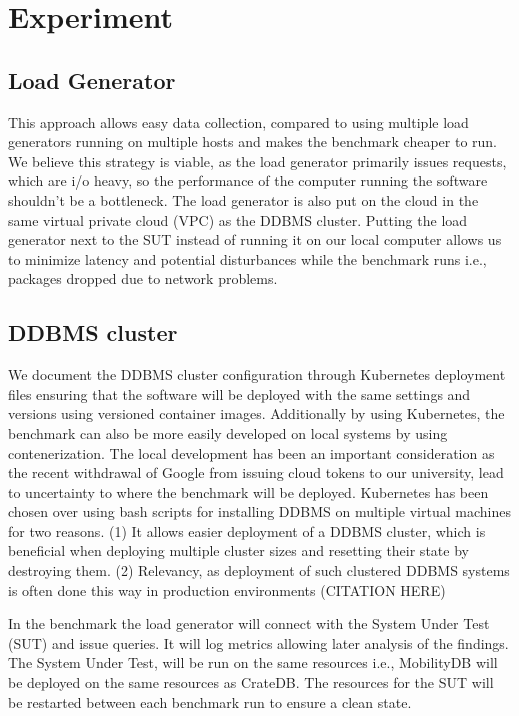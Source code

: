 \section{Experiment}
\label{cha:evaluation}

\subsection{Load Generator}
This approach allows easy data collection, compared to using multiple load generators running on multiple hosts and makes the benchmark cheaper to run.
We believe this strategy is viable, as the load generator primarily issues requests, which are i/o heavy, so the performance of the computer running the software shouldn't be a bottleneck.
The load generator is also put on the cloud in the same virtual private cloud (VPC) as the DDBMS cluster.
Putting the load generator next to the SUT instead of running it on our local computer allows us to minimize latency and potential disturbances while the benchmark runs i.e., packages dropped due to network problems.


\subsection{DDBMS cluster}
We document the DDBMS cluster configuration through Kubernetes deployment files ensuring that the software will be deployed with the same settings and versions using versioned container images.
Additionally by using Kubernetes, the benchmark can also be more easily developed on local systems by using contenerization.
The local development has been an important consideration as the recent withdrawal of Google from issuing cloud tokens to our university, lead to uncertainty to where the benchmark will be deployed.
Kubernetes has been chosen over using bash scripts for installing DDBMS on multiple virtual machines for two reasons.
(1) It allows easier deployment of a DDBMS cluster, which is beneficial when deploying multiple cluster sizes and resetting their state by destroying them.
(2) Relevancy, as deployment of such clustered DDBMS systems is often done this way in production environments (CITATION HERE)

In the benchmark the load generator will connect with the System Under Test (SUT) and issue queries.
It will log metrics allowing later analysis of the findings.
The System Under Test, will be run on the same resources i.e., MobilityDB will be deployed on the same resources as CrateDB.
The resources for the SUT will be restarted between each benchmark run to ensure a clean state.

